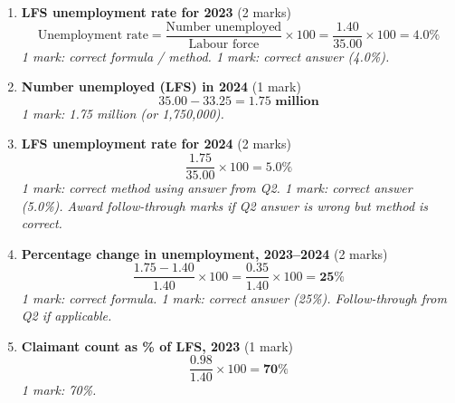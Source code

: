 \documentclass[12pt,a4paper]{article}
\begin{document}
\begin{enumerate}[leftmargin=*, label=\textbf{\arabic*.}]

    \item \textbf{LFS unemployment rate for 2023} \hfill (2 marks)\\
    \[
        \text{Unemployment rate} = \frac{\text{Number unemployed}}{\text{Labour force}} \times 100
        = \frac{1.40}{35.00} \times 100 = \mathbf{4.0\%}
    \]
    \textit{1 mark: correct formula / method. 1 mark: correct answer (4.0\%).}

    \vspace{0.5em}

    \item \textbf{Number unemployed (LFS) in 2024} \hfill (1 mark)\\
    \[
        35.00 - 33.25 = \mathbf{1.75 \text{ million}}
    \]
    \textit{1 mark: 1.75 million (or 1,750,000).}

    \vspace{0.5em}

    \item \textbf{LFS unemployment rate for 2024} \hfill (2 marks)\\
    \[
        \frac{1.75}{35.00} \times 100 = \mathbf{5.0\%}
    \]
    \textit{1 mark: correct method using answer from Q2. 1 mark: correct answer (5.0\%). Award follow-through marks if Q2 answer is wrong but method is correct.}

    \vspace{0.5em}

    \item \textbf{Percentage change in unemployment, 2023--2024} \hfill (2 marks)\\
    \[
        \frac{1.75 - 1.40}{1.40} \times 100 = \frac{0.35}{1.40} \times 100 = \mathbf{25\%}
    \]
    \textit{1 mark: correct formula. 1 mark: correct answer (25\%). Follow-through from Q2 if applicable.}

    \vspace{0.5em}

    \item \textbf{Claimant count as \% of LFS, 2023} \hfill (1 mark)\\
    \[
        \frac{0.98}{1.40} \times 100 = \mathbf{70\%}
    \]
    \textit{1 mark: 70\%.}

\end{enumerate}

\newpage

\end{document}
